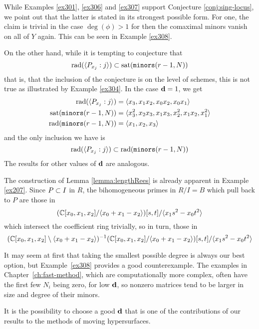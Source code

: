 \documentclass[fleqn,reqno]{amsart}
\begin{document}
\begin{example}[$\mt{ex315}$]
\label{ex315}
While Examples \ref{ex301}, \ref{ex306} and \ref{ex307} support Conjecture \ref{conj:sing-locus},
we point out that the latter is stated in its strongest possible form.
For one, the claim is trivial in the case $\deg(\phi)>1$
for then the comaximal minors vanish on all of $Y$ again.
This can be seen in Example \ref{ex308}.

On the other hand, while it is tempting to conjecture that
\[
	\operatorname{rad}(\langle P_{x_j}:j\rangle)\subset\operatorname{sat}(\mathop{\tt minors}(r-1,N))
\]
that is, that the inclusion of the conjecture is on the level of schemes,
this is not true as illustrated by Example \ref{ex304}.
In the case $\mathbf d=1$, we get
\begin{align*}
	\operatorname{rad}(\langle P_{x_j}:j\rangle)&=\langle {x}_{3},{x}_{1} {x}_{2},{x}_{0} {x}_{2},{x}_{0} {x}_{1}\rangle\\
	\operatorname{sat}(\mathop{\tt minors}(r-1,N))&=\langle{x}_{3}^{2},{x}_{2} {x}_{3},{x}_{1} {x}_{3},{x}_{2}^{2},{x}_{1}
      {x}_{2},{x}_{1}^{2}\rangle\\
	\operatorname{rad}(\mathop{\tt minors}(r-1,N))&=\langle {x}_{1},{x}_{2},{x}_{3}\rangle
\end{align*}
and the only inclusion we have is
\[
	\operatorname{rad}(\langle P_{x_j}:j\rangle)\subset\operatorname{rad}(\mathop{\tt minors}(r-1,N))
\]
The results for other values of $\mathbf d$ are analogous.
\end{example}

\begin{example}[316]
\label{ex316}
The construction of Lemma \ref{lemma:lengthRees} is already apparent in Example \ref{ex207}.
Since $P\subset I$ in $R$, the bihomogeneous primes in $R/I=B$
which pull back to $P$ are those in
\[
	(\mathbb{C}[x_0,x_1,x_2]/\langle x_0+x_1-x_2\rangle)[s,t]/\langle x_1s^2-x_0t^2\rangle
\]
which intersect the coefficient ring trivially, so in turn, those in
\[
	(\mathbb{C}[x_0,x_1,x_2]\setminus\langle x_0+x_1-x_2\rangle)^{-1}(\mathbb{C}[x_0,x_1,x_2]/\langle x_0+x_1-x_2\rangle)[s,t]/\langle x_1s^2-x_0t^2\rangle
\]
\end{example}

\begin{example}
\label{ex317}
It may seem at first that taking the smallest possible degree is always our best option,
but Example~\ref{ex308} provides a good counterexample.
The examples in Chapter~\ref{ch:fast-method}, which are computationally more complex,
often have the first few $N_i$ being zero, for low $\mathbf d$,
so nonzero matrices tend to be larger in size and degree of their minors.

It is the possibility to choose a good $\mathbf d$ that is one of the contributions of
our results to the methods of moving hypersurfaces.
\end{example}





\end{document}
